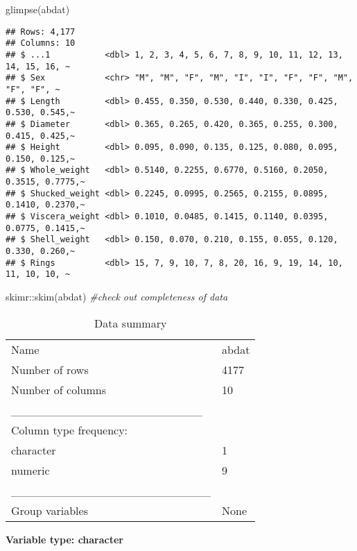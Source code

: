 \documentclass[
]{article}
\newenvironment{Shaded}{\begin{snugshade}}{\end{snugshade}}
\newcommand{\CommentTok}[1]{\textcolor[rgb]{0.56,0.35,0.01}{\textit{#1}}}
\newcommand{\FunctionTok}[1]{\textcolor[rgb]{0.00,0.00,0.00}{#1}}
\newcommand{\NormalTok}[1]{#1}
\newcommand{\SpecialCharTok}[1]{\textcolor[rgb]{0.00,0.00,0.00}{#1}}
\begin{document}
\begin{Shaded}
\begin{Highlighting}[]
\FunctionTok{glimpse}\NormalTok{(abdat)}
\end{Highlighting}
\end{Shaded}

\begin{verbatim}
## Rows: 4,177
## Columns: 10
## $ ...1           <dbl> 1, 2, 3, 4, 5, 6, 7, 8, 9, 10, 11, 12, 13, 14, 15, 16, ~
## $ Sex            <chr> "M", "M", "F", "M", "I", "I", "F", "F", "M", "F", "F", ~
## $ Length         <dbl> 0.455, 0.350, 0.530, 0.440, 0.330, 0.425, 0.530, 0.545,~
## $ Diameter       <dbl> 0.365, 0.265, 0.420, 0.365, 0.255, 0.300, 0.415, 0.425,~
## $ Height         <dbl> 0.095, 0.090, 0.135, 0.125, 0.080, 0.095, 0.150, 0.125,~
## $ Whole_weight   <dbl> 0.5140, 0.2255, 0.6770, 0.5160, 0.2050, 0.3515, 0.7775,~
## $ Shucked_weight <dbl> 0.2245, 0.0995, 0.2565, 0.2155, 0.0895, 0.1410, 0.2370,~
## $ Viscera_weight <dbl> 0.1010, 0.0485, 0.1415, 0.1140, 0.0395, 0.0775, 0.1415,~
## $ Shell_weight   <dbl> 0.150, 0.070, 0.210, 0.155, 0.055, 0.120, 0.330, 0.260,~
## $ Rings          <dbl> 15, 7, 9, 10, 7, 8, 20, 16, 9, 19, 14, 10, 11, 10, 10, ~
\end{verbatim}

\begin{Shaded}
\begin{Highlighting}[]
\NormalTok{skimr}\SpecialCharTok{::}\FunctionTok{skim}\NormalTok{(abdat) }\CommentTok{\#check out completeness of data}
\end{Highlighting}
\end{Shaded}

\begin{longtable}[]{@{}ll@{}}
\caption{Data summary}\tabularnewline
\toprule()
\endhead
Name & abdat \\
Number of rows & 4177 \\
Number of columns & 10 \\
\_\_\_\_\_\_\_\_\_\_\_\_\_\_\_\_\_\_\_\_\_\_\_ & \\
Column type frequency: & \\
character & 1 \\
numeric & 9 \\
\_\_\_\_\_\_\_\_\_\_\_\_\_\_\_\_\_\_\_\_\_\_\_\_ & \\
Group variables & None \\
\bottomrule()
\end{longtable}

\textbf{Variable type: character}
\end{document}

